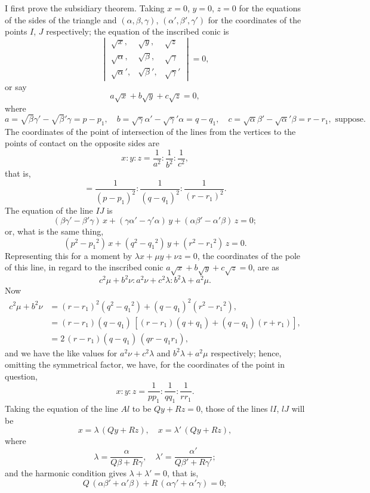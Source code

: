 \documentclass[11pt,a4paper]{article}
\begin{document}
I first prove the subsidiary theorem. Taking $x=0$, $y=0$, $z=0$ for the equations
of the sides of the triangle and $(\alpha, \beta, \gamma)$, $(\alpha', \beta', \gamma')$ for the coordinates of the points
$I$, $J$ respectively; the equation of the inscribed conic is
\[
\begin{vmatrix}
\sqrt{x}, & \sqrt{y}, & \sqrt{z} \\
\sqrt{\alpha}, & \sqrt{\beta}, & \sqrt{\gamma} \\
\sqrt{\alpha}', & \sqrt{\beta}', & \sqrt{\gamma}'
\end{vmatrix} = 0,
\]
or say
\[
a\sqrt{x} + b\sqrt{y} + c\sqrt{z} = 0,
\]
where
\[
a = \sqrt{\beta}\gamma' - \sqrt{\beta}'\gamma = p-p_1,\quad
b = \sqrt{\gamma}\alpha' - \sqrt{\gamma}'\alpha = q-q_1,\quad
c = \sqrt{\alpha}\beta' - \sqrt{\alpha}'\beta = r-r_1, \text{ suppose.}
\]
The coordinates of the point of intersection of the lines from the vertices to the
points of contact on the opposite sides are
\[
x : y : z = \frac{1}{a^2} : \frac{1}{b^2} : \frac{1}{c^2},
\]
that is,
\[
= \frac{1}{(p-p_1)^2} : \frac{1}{(q-q_1)^2} : \frac{1}{(r-r_1)^2}.
\]
The equation of the line $IJ$ is
\[
(\beta\gamma' - \beta'\gamma)\,x + (\gamma\alpha' - \gamma'\alpha)\,y + (\alpha\beta' - \alpha'\beta)\,z = 0;
\]
or, what is the same thing,
\[
(p^2 - p_1{}^2)\,x + (q^2 - q_1{}^2)\,y + (r^2 - r_1{}^2)\,z = 0.
\]
Representing this for a moment by $\lambda x + \mu y + \nu z = 0$, the coordinates of the pole of
this line, in regard to the inscribed conic $a\sqrt{x} + b\sqrt{y} + c\sqrt{z} = 0$, are as
\[
c^2\mu + b^2\nu : a^2\nu + c^2\lambda : b^2\lambda + a^2\mu.
\]
Now
\begin{align*}
c^2\mu + b^2\nu &= (r-r_1)^2(q^2 - q_1{}^2) + (q-q_1)^2(r^2 - r_1{}^2),\\
&= (r-r_1)(q-q_1)\,[(r-r_1)(q+q_1) + (q-q_1)(r+r_1)],\\
&= 2\,(r-r_1)(q-q_1)\,(qr - q_1r_1),
\end{align*}
and we have the like values for $a^2\nu + c^2\lambda$ and $b^2\lambda + a^2\mu$ respectively; hence, omitting
the symmetrical factor, we have, for the coordinates of the point in question,
\[
x : y : z = \frac{1}{pp_1} : \frac{1}{qq_1} : \frac{1}{rr_1}.
\]
Taking the equation of the line $Al$ to be $Qy + Rz = 0$, those of the lines $lI$, $lJ$ will be
\[
x = \lambda\,(Qy + Rz), \quad x = \lambda'\,(Qy + Rz),
\]
where
\[
\lambda = \frac{\alpha}{Q\beta + R\gamma}, \quad \lambda' = \frac{\alpha'}{Q\beta' + R\gamma'};
\]
and the harmonic condition gives $\lambda + \lambda' = 0$, that is,
\[
Q\,(\alpha\beta' + \alpha'\beta) + R\,(\alpha\gamma' + \alpha'\gamma) = 0;
\]
\end{document}
